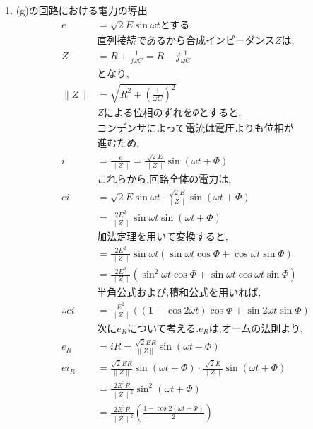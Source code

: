 \documentclass[twocolumn]{article}
\begin{document}
\begin{enumerate}
    \item (g)の回路における電力の導出
    \begin{align*}
      e &= \sqrt{2}E\sin\omega t \text{とする.}\\
      &\text{直列接続であるから合成インピーダンス}Z\text{は,}\\
      Z &= R + \frac{1}{j\omega C} = R -j\frac{1}{\omega C}\\
      &\text{となり,}\\
      \|Z\| &= \sqrt{R^2 + {\left( \frac{1}{\omega C} \right)}^2}\\
      &Z\text{による位相のずれを}\Phi\text{とすると,}\\
      &\text{コンデンサによって電流は電圧よりも位相が}\\
      &\text{進むため,}\\
      i &= \frac{e}{\|Z\|} = \frac{\sqrt{2}E}{\|Z\|}\sin\left(\omega t + \Phi\right)\\
      &\text{これらから,回路全体の電力は,}\\
      ei  &= \sqrt{2}E\sin\omega t \cdot \frac{\sqrt{2}E}{\|Z\|}\sin\left(\omega t + \Phi\right)\\
          &= \frac{2E^2}{\|Z\|}\sin\omega t\sin\left(\omega t + \Phi\right)\\
      &\text{加法定理を用いて変換すると,}\\
          &= \frac{2E^2}{\|Z\|}\sin\omega t\left(\sin\omega t \cos \Phi + \cos\omega t \sin \Phi\right)\\
          &= \frac{2E^2}{\|Z\|}\left(\sin^2\omega t \cos \Phi + \sin\omega t\cos\omega t \sin \Phi\right)\\
      &\text{半角公式および,積和公式を用いれば,}\\
\therefore ei  &= \frac{E^2}{\|Z\|}\left(\left(1-\cos2\omega t\right)\cos \Phi + \sin2\omega t \sin \Phi\right)\\
      &\text{次に}e_R\text{について考える.}e_R\text{は,オームの法則より,}\\
      e_R &= iR = \frac{\sqrt{2}ER}{\|Z\|}\sin\left(\omega t + \Phi\right)\\
      ei_R&= \frac{\sqrt{2}ER}{\|Z\|}\sin\left(\omega t + \Phi\right)\cdot \frac{\sqrt{2}E}{\|Z\|}\sin\left(\omega t + \Phi\right)\\
          &= \frac{2E^2R}{{\|Z\|}^2}\sin^2\left(\omega t + \Phi\right)\\
          &= \frac{2E^2R}{{\|Z\|}^2}\left(\frac{1 - \cos2\left(\omega t + \Phi\right)}{2}\right)\\

\end{align*}
\end{enumerate}
\end{document}
